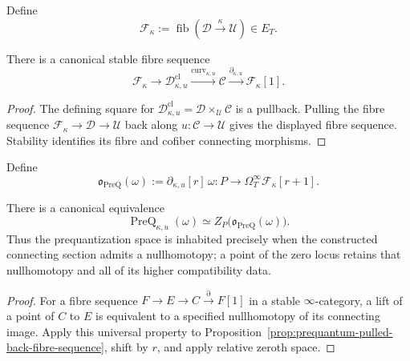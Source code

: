 \begin{definition}
\label{def:prequantum-flat-differential-ambiguity}
Define
\[
\boxed{
\mathscr F_\kappa:=\operatorname{fib}
(\mathscr D\xrightarrow{\kappa}\mathscr U)
\in E_T.
}
\]
\end{definition}

\begin{proposition}
\label{prop:prequantum-pulled-back-fibre-sequence}
There is a canonical stable fibre sequence
\[
\boxed{
\mathscr F_\kappa
\longrightarrow
\mathscr D^{\mathrm{cl}}_{\kappa,u}
\xrightarrow{\operatorname{curv}_{\kappa,u}}
\mathscr C
\xrightarrow{\partial_{\kappa,u}}
\mathscr F_\kappa[1].
}
\]
\end{proposition}

\begin{proof}
The defining square for
$\mathscr D^{\mathrm{cl}}_{\kappa,u}=\mathscr D\times_{\mathscr U}\mathscr C$
is a pullback.  Pulling the fibre sequence
$\mathscr F_\kappa\to\mathscr D\to\mathscr U$ back along
$u:\mathscr C\to\mathscr U$ gives the displayed fibre sequence.  Stability
identifies its fibre and cofiber connecting morphisms.
\end{proof}

\begin{construction}
\label{constr:prequantum-obstruction-section}
Define
\[
\boxed{
\mathfrak o_{\mathrm{PreQ}}(\omega)
:=
\partial_{\kappa,u}[r]\,\omega:
P\longrightarrow
\Omega_T^\infty\mathscr F_\kappa[r+1].
}
\]
\end{construction}

\begin{theorem}
\label{thm:prequantum-obstruction-recognition}
There is a canonical equivalence
\[
\boxed{
\operatorname{PreQ}_{\kappa,u}(\omega)
\simeq
Z_P\bigl(\mathfrak o_{\mathrm{PreQ}}(\omega)\bigr).
}
\]
Thus the prequantization space is inhabited precisely when the constructed
connecting section admits a nullhomotopy; a point of the zero locus retains that
nullhomotopy and all of its higher compatibility data.
\end{theorem}

\begin{proof}
For a fibre sequence $F\to E\to C\xrightarrow{\partial}F[1]$ in a stable
$\infty$-category, a lift of a point of $C$ to $E$ is equivalent to a specified
nullhomotopy of its connecting image.  Apply this universal property to
Proposition~\ref{prop:prequantum-pulled-back-fibre-sequence}, shift by $r$, and
apply relative zeroth space.
\end{proof}

